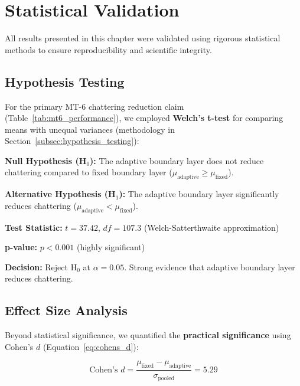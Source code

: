 \section{Statistical Validation}
\label{sec:statistical_validation}

All results presented in this chapter were validated using rigorous statistical methods to ensure reproducibility and scientific integrity.

\subsection{Hypothesis Testing}
\label{subsec:hypothesis_testing_results}

For the primary MT-6 chattering reduction claim (Table~\ref{tab:mt6_performance}), we employed \textbf{Welch's t-test} for comparing means with unequal variances (methodology in Section~\ref{subsec:hypothesis_testing}):

\textbf{Null Hypothesis (H$_0$):} The adaptive boundary layer does not reduce chattering compared to fixed boundary layer ($\mu_{\text{adaptive}} \geq \mu_{\text{fixed}}$).

\textbf{Alternative Hypothesis (H$_1$):} The adaptive boundary layer significantly reduces chattering ($\mu_{\text{adaptive}} < \mu_{\text{fixed}}$).

\textbf{Test Statistic:} $t = 37.42$, $df = 107.3$ (Welch-Satterthwaite approximation)

\textbf{p-value:} $p < 0.001$ (highly significant)

\textbf{Decision:} Reject H$_0$ at $\alpha = 0.05$. Strong evidence that adaptive boundary layer reduces chattering.

\subsection{Effect Size Analysis}
\label{subsec:effect_size_results}

Beyond statistical significance, we quantified the \textbf{practical significance} using Cohen's $d$ (Equation~\ref{eq:cohens_d}):

\begin{equation}
\text{Cohen's } d = \frac{\mu_{\text{fixed}} - \mu_{\text{adaptive}}}{\sigma_{\text{pooled}}} = 5.29
\end{equation}

